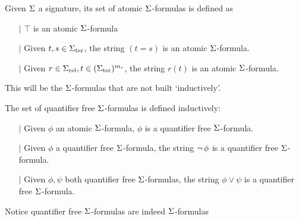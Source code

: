 \begin{dfn}
    Given $\Sigma$ a signature, 
    its set of atomic $\Sigma$-formulas is defined as
    \begin{itemize}
        \item[$\vert$] $\top$ is an atomic $\Sigma$-formula
        \item[$\vert$] Given $t, s \in {\Sigma}_\mathrm{ter}$, 
        the string $(t = s)$ is an atomic $\Sigma$-formula.
        \item[$\vert$] Given $r \in {\Sigma}_\mathrm{rel}, t \in ({\Sigma}_\mathrm{ter})^{m_r}$, 
        the string $r(t)$ is an atomic $\Sigma$-formula.
    \end{itemize}
    This will be the $\Sigma$-formulas that are not built `inductively'.

    The set of quantifier free $\Sigma$-formulas is defined inductively:
    \begin{itemize}
        \item[$\vert$] Given $\phi$ an atomic $\Sigma$-formula,
            $\phi$ is a quantifier free $\Sigma$-formula.
        \item[$\vert$] Given $\phi$ a quantifier free $\Sigma$-formula, 
        the string $\neg\, \phi$ is a quantifier free $\Sigma$-formula. 
        \item[$\vert$] Given $\phi, \psi$ both quantifier free $\Sigma$-formulas, 
        the string $\phi \lor \psi$ is a quantifier free $\Sigma$-formula.
    \end{itemize}
    Notice quantifier free $\Sigma$-formulas are indeed $\Sigma$-formulas
\end{dfn}

